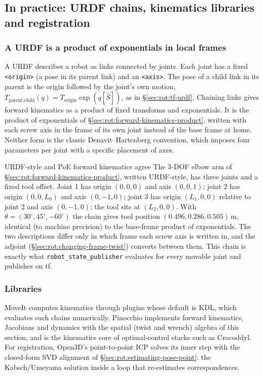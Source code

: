 \subsection{In practice: URDF chains, kinematics libraries and registration}\label{sec:rot:pose-in-practice}

\subsubsection{A URDF is a product of exponentials in local frames}
A URDF describes a robot as links connected by joints. Each joint has a fixed \texttt{<origin>} (a pose in its parent link) and an \texttt{<axis>}. The pose of a child link in its parent is the origin followed by the joint's own motion, $T_{\text{parent},\text{child}}(q)=T_{\text{origin}}\exp(q[\hat S])$, as in \S\ref{sec:rot:tf-urdf}. Chaining links gives forward kinematics as a product of fixed transforms and exponentials. It is the product of exponentials of \S\ref{sec:rot:forward-kinematics-product}, written with each screw axis in the frame of its own joint instead of the base frame at home. Neither form is the classic Denavit--Hartenberg convention, which imposes four parameters per joint with a specific placement of axes.

\begin{example}{URDF-style and PoE forward kinematics agree}
The 3-DOF elbow arm of \S\ref{sec:rot:forward-kinematics-product}, written URDF-style, has three joints and a fixed tool offset. Joint 1 has origin $(0,0,0)$ and axis $(0,0,1)$; joint 2 has origin $(0,0,L_0)$ and axis $(0,-1,0)$; joint 3 has origin $(L_1,0,0)$ relative to joint 2 and axis $(0,-1,0)$; the tool sits at $(L_2,0,0)$. With $\theta=(30^\circ,45^\circ,-60^\circ)$ the chain gives tool position $(0.496,0.286,0.505)$\,m, identical (to machine precision) to the base-frame product of exponentials. The two descriptions differ only in which frame each screw axis is written in, and the adjoint (\S\ref{sec:rot:changing-frame-twist}) converts between them. This chain is exactly what \texttt{robot\_state\_publisher} evaluates for every movable joint and publishes on tf.
\end{example}

\subsubsection{Libraries}
MoveIt computes kinematics through plugins whose default is KDL, which evaluates such chains numerically. Pinocchio implements forward kinematics, Jacobians and dynamics with the spatial (twist and wrench) algebra of this section, and is the kinematics core of optimal-control stacks such as Crocoddyl. For registration, Open3D's point-to-point ICP solves its inner step with the closed-form SVD alignment of \S\ref{sec:rot:estimating-pose-point}: the Kabsch/Umeyama solution inside a loop that re-estimates correspondences.
